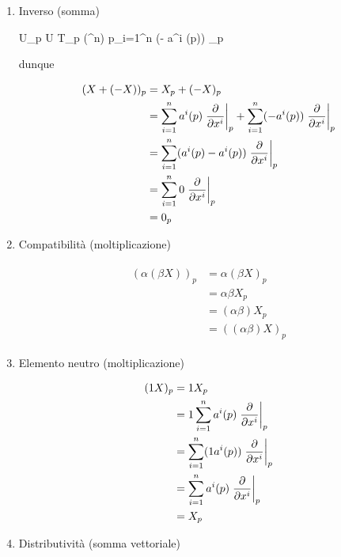 {\begin{enumerate}
	\item Inverso (somma)
	
		{U}{\bigsqcup_{p \in U} T_{p} (\R^{n})}
		{p}{\sum_{i=1}^{n} (- a^{i} (p)) _{p}}
	
	dunque
	
	\begin{align}
		\begin{split}
			(X + (- X))_{p} &= X_{p} + (- X)_{p} \\
			&= \sum_{i=1}^{n} a^{i} (p) \eval{ \pdv{x^{i}} }_{p} + \sum_{i=1}^{n} (- a^{i} (p)) \eval{ \pdv{x^{i}} }_{p} \\
			&= \sum_{i=1}^{n} (a^{i} (p) - a^{i} (p)) \eval{ \pdv{x^{i}} }_{p} \\
			&= \sum_{i=1}^{n} 0 \eval{ \pdv{x^{i}} }_{p} \\
			&= 0_{p}
		\end{split}
	\end{align}
	
	\item Compatibilità (moltiplicazione)
	
	\begin{align}
		\begin{split}
			(\alpha (\beta X))_{p} &= \alpha (\beta X)_{p} \\
			&= \alpha \beta X_{p} \\
			&= (\alpha \beta) X_{p} \\
			&= ((\alpha \beta) X)_{p}
		\end{split}
	\end{align}
	
	\item Elemento neutro (moltiplicazione)
	
	\begin{align}
		\begin{split}
			(1 X)_{p} &= 1 X_{p} \\
			&= 1 \sum_{i=1}^{n} a^{i} (p) \eval{ \pdv{x^{i}} }_{p} \\
			&= \sum_{i=1}^{n} (1 a^{i} (p)) \eval{ \pdv{x^{i}} }_{p} \\
			&= \sum_{i=1}^{n} a^{i} (p) \eval{ \pdv{x^{i}} }_{p} \\
			&= X_{p}
		\end{split}
	\end{align}
	
	\item Distributività (somma vettoriale)
	

\end{enumerate}}
